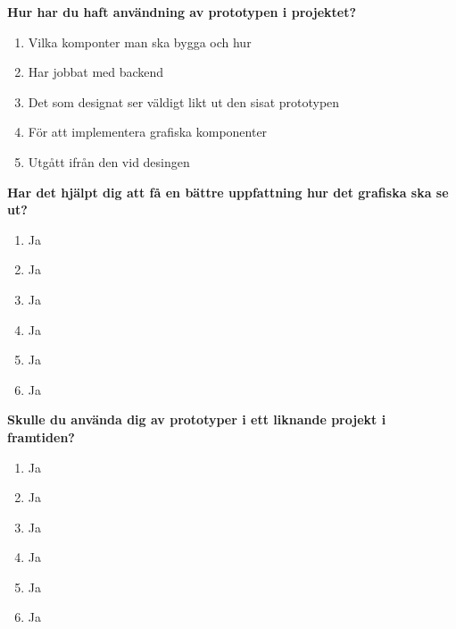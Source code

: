  	\textbf{Hur har du haft användning av prototypen i projektet?} 
 	\begin{enumerate}
	\item Vilka komponter man ska bygga och hur
	\item Har jobbat med backend
	\item Det som designat ser väldigt likt ut den sisat prototypen
	\item För att implementera grafiska komponenter 
	\item Utgått ifrån den vid desingen

 	\end{enumerate}

 	\textbf{Har det hjälpt dig att få en bättre uppfattning hur det grafiska ska se ut?} 
 	
 	\begin{enumerate}
 	\item Ja
	\item Ja 
	\item Ja 
	\item Ja 
	\item Ja   
	\item Ja 

 	\end{enumerate}

 	\textbf{Skulle du använda dig av prototyper i ett liknande projekt i framtiden? } 
 	\begin{enumerate}
 	\item Ja
	\item Ja 
	\item Ja 
	\item Ja 
	\item Ja   
	\item Ja 
 	\end{enumerate}
 